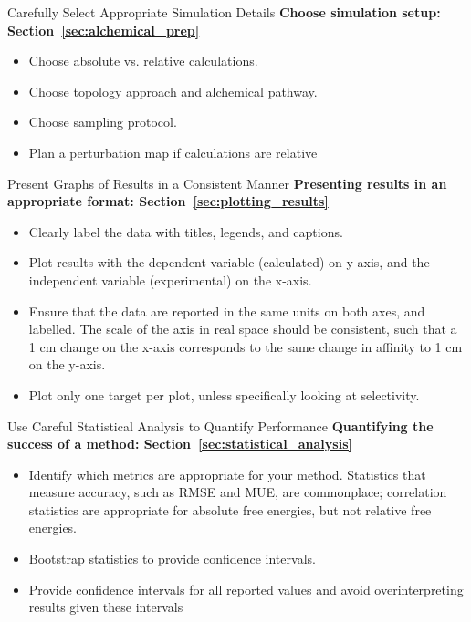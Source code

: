 \documentclass[9pt,bestpractices]{livecoms}
\begin{document}
\begin{Checklists*}
\begin{checklist}{Carefully Select Appropriate Simulation Details}
\textbf{Choose simulation setup: Section~\ref{sec:alchemical_prep}}
    \begin{itemize}
        \item Choose absolute vs. relative calculations.
        \item Choose topology approach and alchemical pathway.
        \item Choose sampling protocol.
        \item Plan a perturbation map if calculations are relative
    \end{itemize}
\end{checklist}
\end{Checklists*}


\begin{Checklists*}
\begin{checklist}{Present Graphs of Results in a Consistent Manner}
\textbf{Presenting results in an appropriate format: Section~\ref{sec:plotting_results}}
\begin{itemize}
\item Clearly label the data with titles, legends, and captions.
\item Plot results with the dependent variable (calculated) on y-axis, and the independent variable (experimental) on the x-axis. 
\item Ensure that the data are reported in the same units on both axes, and labelled. The scale of the axis in real space should be consistent, such that a 1 cm change on the x-axis corresponds to the same change in affinity to 1 cm on the y-axis.
\item Plot only one target per plot, unless specifically looking at selectivity.
\end{itemize}
\end{checklist}

\begin{checklist}{Use Careful Statistical Analysis to Quantify Performance}
\textbf{Quantifying the success of a method: Section~\ref{sec:statistical_analysis}}
\begin{itemize}
\item Identify which metrics are appropriate for your method. Statistics that measure accuracy, such as RMSE and MUE, are commonplace; correlation statistics are appropriate for absolute free energies, but not relative free energies.
\item Bootstrap statistics to provide confidence intervals. 
\item Provide confidence intervals for all reported values and avoid overinterpreting results given these intervals
\end{itemize}
\end{checklist}


\end{Checklists*}
\end{document}
